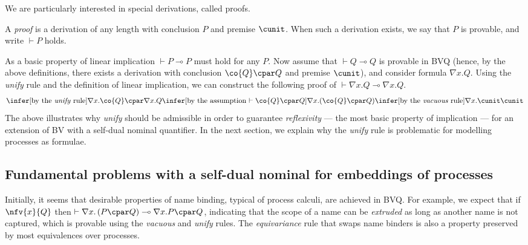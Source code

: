 \documentclass[UKenglish,acmsmall,authorversion]{acmart}
\theoremstyle{plain}
\begin{document}
We are particularly interested in special derivations, called proofs.
\begin{definition}
A \textit{proof} is a derivation of any length with conclusion $P$ and premise $\cunit$. When such a derivation exists, we say that $P$ is provable, and write $\vdash P$ holds.
\end{definition}

As a basic property of linear implication $\vdash P \multimap P$ must hold for any $P$. Now assume that $\vdash Q \multimap Q$ is provable in \textsf{BVQ} (hence, by the above definitions, there exists a derivation with conclusion $\co{Q} \cpar Q$ and premise $\cunit$), and consider formula $\nabla x. Q$. Using the \textit{unify} rule and the definition of linear implication, we can construct the following proof of $\vdash \nabla x.Q \multimap \nabla x.Q$.
\[
\infer[\mbox{by the \textit{unify} rule}]{
\nabla x.\co{Q} \cpar \nabla x.Q 
}{
\infer[\mbox{by the assumption $\vdash \co{Q} \cpar Q$}]{
\mathopen{\nabla x.}\left(\co{Q} \cpar Q\right)
}{
\infer[\mbox{by the \textit{vacuous} rule}]{
\nabla x.\cunit
}{
\cunit
}}}
\]
The above illustrates why \textit{unify} should be admissible in order to guarantee \textit{reflexivity} --- the most basic property of implication --- for an extension of \textsf{BV} with a self-dual nominal quantifier.
In the next section, we explain why the \textit{unify} rule is problematic for modelling processes as formulae.


\subsection{Fundamental problems with a self-dual nominal for embeddings of processes}

Initially, it seems that desirable properties of name binding, typical of process calculi, are achieved in \textsf{BVQ}.
For example, we expect that if $\nfv{x}{Q}$ then $\vdash \nabla x.\left( P \cpar Q \right) \multimap \nabla x.P \cpar Q$,
indicating that the scope of a name can be \textit{extruded} as long as another name is not captured,
which is provable using the \textit{vacuous} and \textit{unify} rules.
The \textit{equivariance} rule that swaps name binders is also a property preserved by most equivalences over processes.
\end{document}

